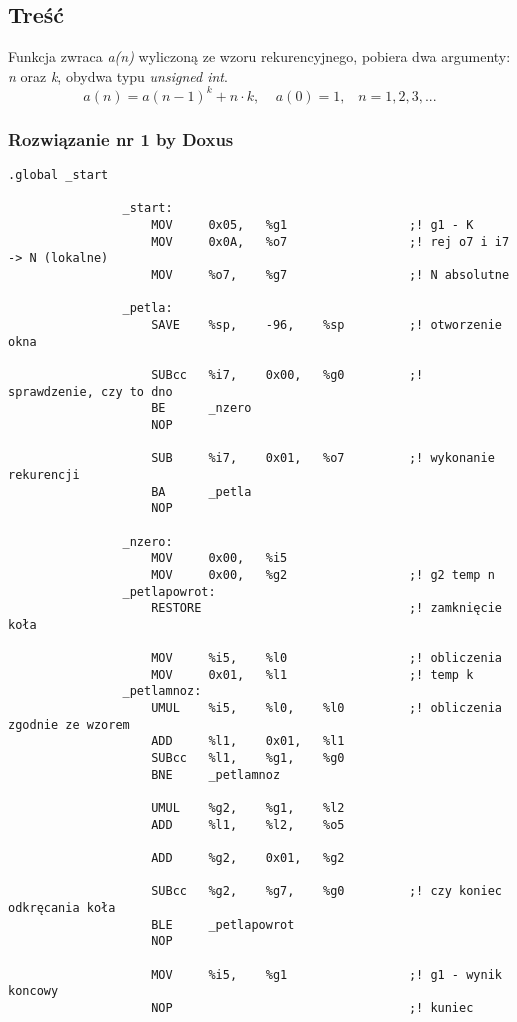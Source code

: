 		\subsection{Treść}
			Funkcja zwraca \emph{a(n)} wyliczoną ze wzoru rekurencyjnego, pobiera dwa argumenty: \emph{n} oraz \emph{k}, obydwa typu \textit{unsigned int}.
			$$ a(n)=a(n-1)^k+n\cdot k,\;\;\;\;a(0)=1,\;\;\;n=1,2,3,... $$
		\subsubsection{Rozwiązanie nr 1 by Doxus}
			\begin{lstlisting}[language={[sparc]Assembler}]
				.global _start
				
				_start:
					MOV		0x05,	%g1					;! g1 - K
					MOV		0x0A,	%o7					;! rej o7 i i7 -> N (lokalne)
					MOV		%o7,	%g7					;! N absolutne
				
				_petla:
					SAVE	%sp,	-96,	%sp			;! otworzenie okna
				
					SUBcc	%i7,	0x00,	%g0			;! sprawdzenie, czy to dno
					BE		_nzero
					NOP
					
					SUB		%i7,	0x01,	%o7			;! wykonanie rekurencji
					BA		_petla
					NOP
					
				_nzero:
					MOV		0x00,	%i5
					MOV		0x00,	%g2					;! g2 temp n
				_petlapowrot:
					RESTORE								;! zamknięcie koła
					
					MOV		%i5,	%l0					;! obliczenia
					MOV		0x01,	%l1					;! temp k
				_petlamnoz:
					UMUL	%i5,	%l0,	%l0			;! obliczenia zgodnie ze wzorem
					ADD		%l1,	0x01,	%l1
					SUBcc	%l1,	%g1,	%g0
					BNE		_petlamnoz
					
					UMUL	%g2,	%g1,	%l2
					ADD		%l1,	%l2,	%o5
				
					ADD		%g2,	0x01,	%g2
					
					SUBcc	%g2,	%g7,	%g0			;! czy koniec odkręcania koła
					BLE		_petlapowrot
					NOP
				
					MOV		%i5,	%g1					;! g1 - wynik koncowy
					NOP									;! kuniec
			\end{lstlisting}
